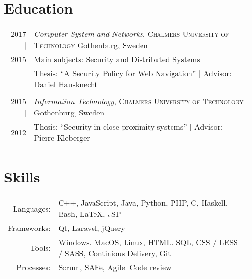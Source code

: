 \documentclass[a4paper,10pt]{scrartcl} %
\begin{document}

\section{Education}

\begin{tabular}{r|p{15cm}}	
2017 |	        & \emph{Computer System and Networks}, \textsc{Chalmers University of Technology} \hfill Gothenburg, Sweden \\
2015			        & \footnotesize{Main subjects: Security and Distributed Systems} \\
\phantom{abcdefghijklm}	& \footnotesize{Thesis: ``A Security Policy for Web Navigation'' | Advisor: Daniel Hausknecht} \\
\multicolumn{2}{c}{} \\


2015 |      	& \emph{Information Technology}, \textsc{Chalmers University of Technology} \hfill Gothenburg, Sweden \\
2012			& \footnotesize{Thesis: ``Security in close proximity systems'' | Advisor: Pierre Kleberger} \\
\multicolumn{2}{c}{} \\

\end{tabular}


\section{Skills}

\begin{tabular}{rp{15cm}}
\phantom{abcde} Languages: 		    & C++, JavaScript, Java, Python, PHP, C, Haskell, Bash, \LaTeX, JSP \\
Frameworks:	                        & Qt, Laravel, jQuery \\
Tools:	                            & Windows, MacOS, Linux, HTML, SQL, CSS / LESS / SASS, Continious Delivery, Git \\
Processes:                          & Scrum, SAFe, Agile, Code review 
\end{tabular}


\newpage
\end{document}

